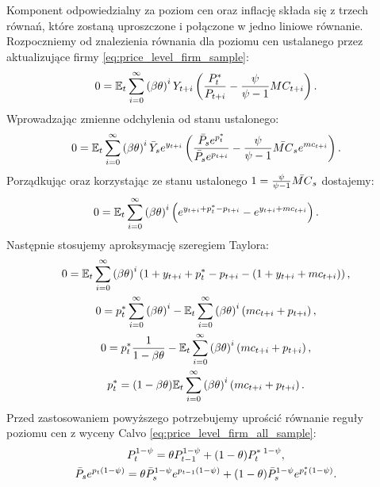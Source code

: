 Komponent odpowiedzialny za poziom cen oraz inflację składa się z trzech równań, które zostaną uproszczone i połączone w jedno liniowe równanie. Rozpoczniemy od znalezienia równania dla poziomu cen ustalanego przez aktualizujące firmy \eqref{eq:price_level_firm_sample}:
\begin{equation}
    0 = \mathbb{E}_t \sum_{i=0}^{\infty}\left( \beta \theta \right)^i Y_{t+i} \left( \frac{P^*_{t}}{P_{t+i}} - \frac{\psi}{\psi - 1} MC_{t+i}\right).
\end{equation}
Wprowadzając zmienne odchylenia od stanu ustalonego:
\begin{equation}
    0 = \mathbb{E}_t \sum_{i=0}^{\infty}\left( \beta \theta \right)^i \bar{Y}_s e^{y_{t+i}} \left( \frac{\bar{P}_se^{p^*_{t}}}{\bar{P}_se^{p_{t+i}}} - \frac{\psi}{\psi - 1} \bar{MC}_s e^{mc_{t+i}}\right).
\end{equation}
Porządkując oraz korzystając ze stanu ustalonego $1 = \frac{\psi}{\psi - 1} \bar{MC}_s$ dostajemy:
\begin{equation}
    0 = \mathbb{E}_t \sum_{i=0}^{\infty}\left( \beta \theta \right)^i \left( e^{y_{t+i} + p^*_{t} - p_{t+i}} - e^{y_{t+i} + mc_{t+i}}\right).
\end{equation}
Następnie stosujemy aproksymację szeregiem Taylora:
\begin{gather}
    0 = \mathbb{E}_t \sum_{i=0}^{\infty}\left( \beta \theta \right)^i \left( 1 + y_{t+i} + p^*_{t} - p_{t+i} - (1 + y_{t+i} + mc_{t+i})\right), \\
    0 = p^*_{t} \sum_{i=0}^{\infty}\left( \beta \theta \right)^i - \mathbb{E}_t \sum_{i=0}^{\infty}\left( \beta \theta \right)^i \left(  mc_{t+i} + p_{t+i} \right), \\
    0 =  p^*_{t} \frac{1}{1-\beta\theta} - \mathbb{E}_t \sum_{i=0}^{\infty}\left( \beta \theta \right)^i \left(  mc_{t+i} + p_{t+i} \right), \\
    p^*_t = (1-\beta\theta)\mathbb{E}_t \sum_{i=0}^{\infty}\left( \beta \theta \right)^i \left(  mc_{t+i} + p_{t+i} \right)
    \label{eq:price_level_approx_def}.
\end{gather}
Przed zastosowaniem powyższego potrzebujemy uprościć równanie reguły poziomu cen z wyceny Calvo \eqref{eq:price_level_firm_all_sample}:
\begin{gather}
    P_t^{1-\psi} = \theta P_{t-1}^{1-\psi} + (1-\theta) P_{t}^{*\;1-\psi}, \\
    \bar{P}_se^{p_t(1-\psi)} = \theta \bar{P}_s^{1-\psi} e^{p_{t-1}(1-\psi)} + (1-\theta) \bar{P}_s^{1-\psi} e^{p_t^*(1-\psi)}.
\end{gather}

